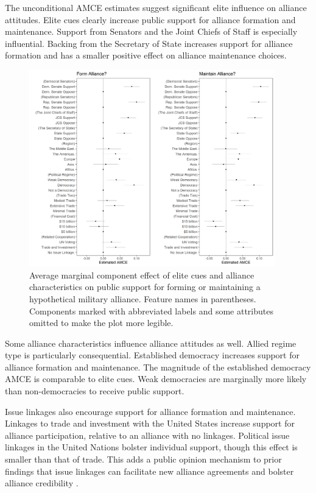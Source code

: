 \documentclass[12pt]{article}
\begin{document}
The unconditional AMCE estimates suggest significant elite influence on alliance attitudes. 
Elite cues clearly increase public support for alliance formation and maintenance. 
Support from Senators and the Joint Chiefs of Staff is especially influential.
Backing from the Secretary of State increases support for alliance formation and has a smaller positive effect on alliance maintenance choices. 


\begin{figure}
	\centering
		\includegraphics[width=0.95\textwidth]{../figures/joint-amce-plots.png}
	\caption{Average marginal component effect of elite cues and alliance characteristics on public support for forming or maintaining a hypothetical military alliance. Feature names in parentheses. Components marked with abbreviated labels and some attributes omitted to make the plot more legible.}
	\label{fig:joint-plot}
\end{figure}


Some alliance characteristics influence alliance attitudes as well. 
Allied regime type is particularly consequential. 
Established democracy increases support for alliance formation and maintenance.
The magnitude of the established democracy AMCE is comparable to elite cues.   
Weak democracies are marginally more likely than non-democracies to receive public support.


Issue linkages also encourage support for alliance formation and maintenance. 
Linkages to trade and investment with the United States increase support for alliance participation, relative to an alliance with no linkages. 
Political issue linkages in the United Nations bolster individual support, though this effect is smaller than that of trade. 
This adds a public opinion mechanism to prior findings that issue linkages can facilitate new alliance agreements \citep{Poast2012} and bolster alliance credibility \citep{Poast2013}. 
\end{document}
